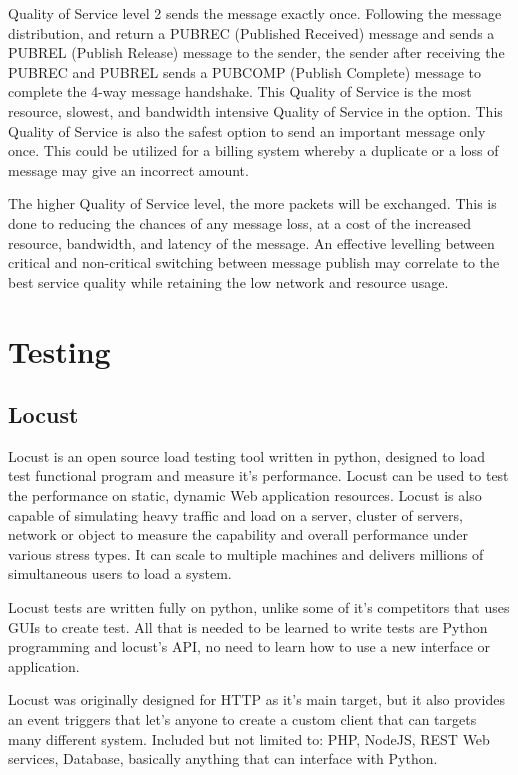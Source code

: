 Quality of Service level 2  sends the message exactly once. Following the message distribution, and return a PUBREC (Published Received) message and sends a PUBREL (Publish Release) message to the sender, the sender after receiving the PUBREC and PUBREL sends a PUBCOMP (Publish Complete) message to complete the 4-way message handshake. This Quality of Service is the most resource, slowest, and bandwidth intensive Quality of Service in the option. This Quality of Service is also the safest option to send an important message only once. This could be utilized for a billing system whereby a duplicate or a loss of message may give an incorrect amount.

The higher Quality of Service level, the more packets will be exchanged. This is done to reducing the chances of any message loss, at a cost of the increased resource, bandwidth, and latency of the message. An effective levelling between critical and non-critical switching between message publish may correlate to the best service quality while retaining the low network and resource usage. 

\section{Testing}
\subsection{Locust}
Locust is an open source load testing tool written in python, designed to load test functional program and measure it's performance. Locust can be used to test the performance on static, dynamic Web application resources. Locust is also capable of simulating heavy traffic and load on a server, cluster of servers, network or object to measure the capability and overall performance under various stress types. It can scale to multiple machines and delivers millions of simultaneous users to load a system.

Locust tests are written fully on python, unlike some of it's competitors that uses GUIs to create test. All that is needed to be learned to write tests are Python programming and locust's API, no need to learn how to use a new interface or application.

Locust was originally designed for HTTP as it's main target, but it also provides an event triggers that let's anyone to create a custom client that can targets many different system. Included but not limited to: PHP, NodeJS, REST Web services, Database, basically anything that can interface with Python. 

